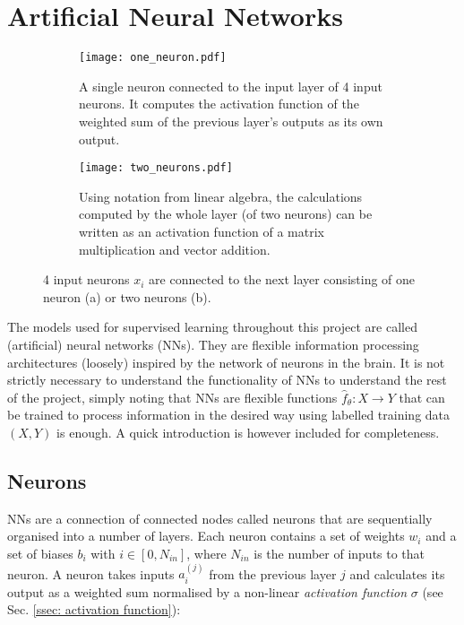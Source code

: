 \section{Artificial Neural Networks \label{sec: neural nets}}

    \begin{figure}[h]
        \centering
        \begin{subfigure}[b]{0.9\textwidth}
            \texttt{[image: one\_neuron.pdf]}
            \caption{A single neuron connected to the input layer of 4 input neurons. It computes the activation function of the weighted sum of the previous layer's outputs as its own output. \label{subfig: neuron}}
        \end{subfigure}
        \hfill
        \begin{subfigure}[b]{0.9\textwidth}
            \texttt{[image: two\_neurons.pdf]}
            \caption{Using notation from linear algebra, the calculations computed by the whole layer (of two neurons) can be written as an activation function of a matrix multiplication and vector addition. \label{subfig: layer}}
        \end{subfigure}
        \caption{4 input neurons $x_i$ are connected to the next layer consisting of one neuron (a) or two neurons (b).}
    \end{figure}

    

    The models used for supervised learning throughout this project are called (artificial) neural networks (NNs). They are flexible information processing architectures (loosely) inspired by the network of neurons in the brain. It is not strictly necessary to understand the functionality of NNs to understand the rest of the project, simply noting that NNs are flexible functions $\hat{f}_{\theta} : X \rightarrow Y$ that can be trained to process information in the desired way using labelled training data $(X, Y)$ is enough. A quick introduction is however included for completeness.
    
    \subsection{Neurons}
        NNs are a connection of connected nodes called neurons that are sequentially organised into a number of layers. Each neuron contains a set of weights $w_i$ and a set of biases $b_i$ with $i \in [0, N_{in}]$, where $N_{in}$ is the number of inputs to that neuron. A neuron takes inputs $a_i^{(j)}$ from the previous layer $j$ and calculates its output as a weighted sum normalised by a non-linear \textit{activation function} $\sigma$ (see Sec. \ref{ssec: activation function}):
    
